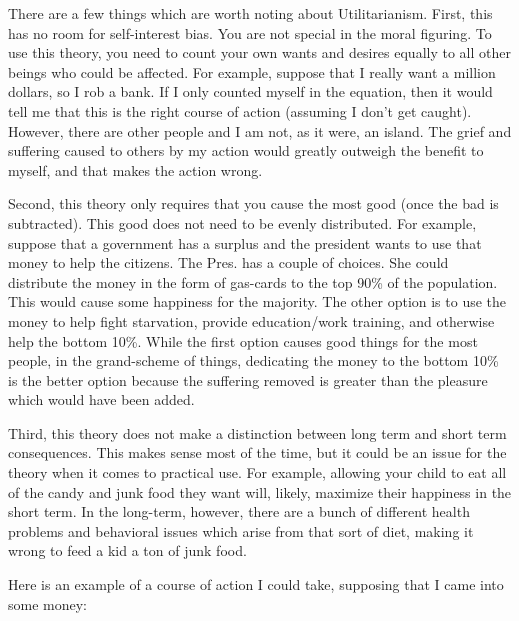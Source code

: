 There are a few things which are worth noting about Utilitarianism. First, this has no room for self-interest bias. You are not special in the moral figuring. To use this theory, you need to count your own wants and desires equally to all other beings who could be affected. For example, suppose that I really want a million dollars, so I rob a bank. If I only counted myself in the equation, then it would tell me that this is the right course of action (assuming I don't get caught). However, there are other people and I am not, as it were, an island. The grief and suffering caused to others by my action would greatly outweigh the benefit to myself, and that makes the action wrong.

Second, this theory only requires that you cause the most good (once the bad is subtracted). This good does not need to be evenly distributed. For example, suppose that a government has a surplus and the president wants to use that money to help the citizens. The Pres. has a couple of choices. She could distribute the money in the form of gas-cards to the top 90\% of the population. This would cause some happiness for the majority. The other option is to use the money to help fight starvation, provide education/work training, and otherwise help the bottom 10\%. While the first option causes good things for the most people, in the grand-scheme of things, dedicating the money to the bottom 10\% is the better option because the suffering removed is greater than the pleasure which would have been added. 

Third, this theory does not make a distinction between long term and short term consequences. This makes sense most of the time, but it could be an issue for the theory when it comes to practical use. For example, allowing your child to eat all of the candy and junk food they want will, likely, maximize their happiness in the short term. In the long-term, however, there are a bunch of different health problems and behavioral issues which arise from that sort of diet, making it wrong to feed a kid a ton of junk food.

Here is an example of a course of action I could take, supposing that I came into some money:
	
